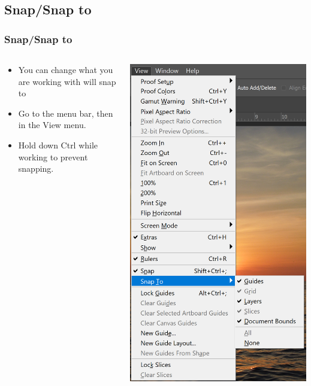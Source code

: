 \documentclass{beamer}
\begin{document}
\subsection{Snap/Snap to}
	\begin{frame}
	\frametitle{Snap/Snap to}
			\begin{columns}
		\vspace{-25pt}
		\begin{center}
	\begin{itemize}
		\item You can change what you are working with will snap to
		\item Go to the menu bar, then in the View menu.
		\item Hold down Ctrl while working to prevent snapping.
	\end{itemize}
\end{center}
	\begin{center}
			\includegraphics[width = 1.0\textwidth]{images/snap.png}
	\end{center}
\end{columns}
\end{frame}
\end{document}
